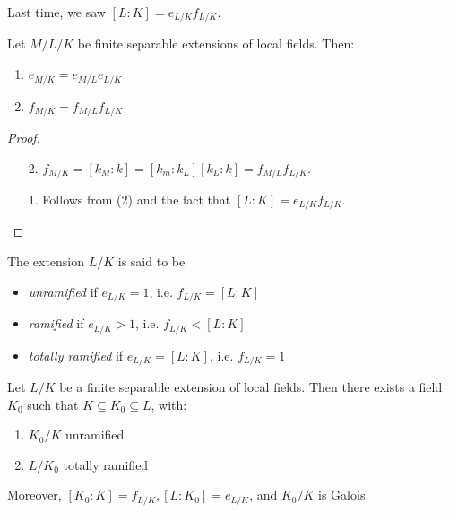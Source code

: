 \documentclass[10pt,a4paper]{article}
\begin{document}
Last time, we saw $[L:K] = e_{L/K}f_{L/K}$.
\begin{lemma}
  Let $M/L/K$ be finite separable extensions of local fields. Then:
  \begin{enumerate}
    \item $e_{M/K} = e_{M/L}e_{L/K}$
    \item $f_{M/K} = f_{M/L}f_{L/K}$
  \end{enumerate}
\end{lemma}
\begin{proof}\hspace*{0cm}
  \begin{enumerate}
    \item[2.] $f_{M/K} = [k_M:k] = [k_m:k_L][k_L:k] = f_{M/L}f_{L/K}$.
    \item[1.] Follows from (2) and the fact that $[L:K] = e_{L/K}f_{L/K}$.
  \end{enumerate}
\end{proof}
\begin{definition}
  The extension $L/K$ is said to be
  \begin{itemize}
    \item \emph{unramified} if $e_{L/K} = 1$, i.e. $f_{L/K} = [L:K]$
    \item \emph{ramified} if $e_{L/K} > 1$, i.e. $f_{L/K} < [L:K]$
    \item \emph{totally ramified} if $e_{L/K} = [L:K]$, i.e. $f_{L/K} = 1$
  \end{itemize}
\end{definition}
\begin{theorem}
  Let $L/K$ be a finite separable extension of local fields. Then there exists a field $K_0$ such that $K \subseteq K_0 \subseteq L$, with:
  \begin{enumerate}
    \item $K_0/K$ unramified
    \item $L/K_0$ totally ramified
  \end{enumerate}
  Moreover, $[K_0:K] = f_{L/K}, [L:K_0] = e_{L/K}$, and $K_0/K$ is Galois.
\end{theorem}
\end{document}
